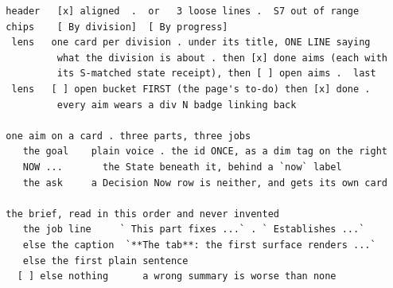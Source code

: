 \begin{verbatim}
  header   [x] aligned  .  or   3 loose lines .  S7 out of range
  chips    [ By division]  [ By progress]
   lens   one card per division . under its title, ONE LINE saying
           what the division is about . then [x] done aims (each with
           its S-matched state receipt), then [ ] open aims .  last
   lens   [ ] open bucket FIRST (the page's to-do) then [x] done .
           every aim wears a div N badge linking back

  one aim on a card . three parts, three jobs
     the goal    plain voice . the id ONCE, as a dim tag on the right
     NOW ...       the State beneath it, behind a `now` label
     the ask     a Decision Now row is neither, and gets its own card

  the brief, read in this order and never invented
     the job line     ` This part fixes ...` . ` Establishes ...`
     else the caption  `**The tab**: the first surface renders ...`
     else the first plain sentence
    [ ] else nothing      a wrong summary is worse than none
\end{verbatim}
